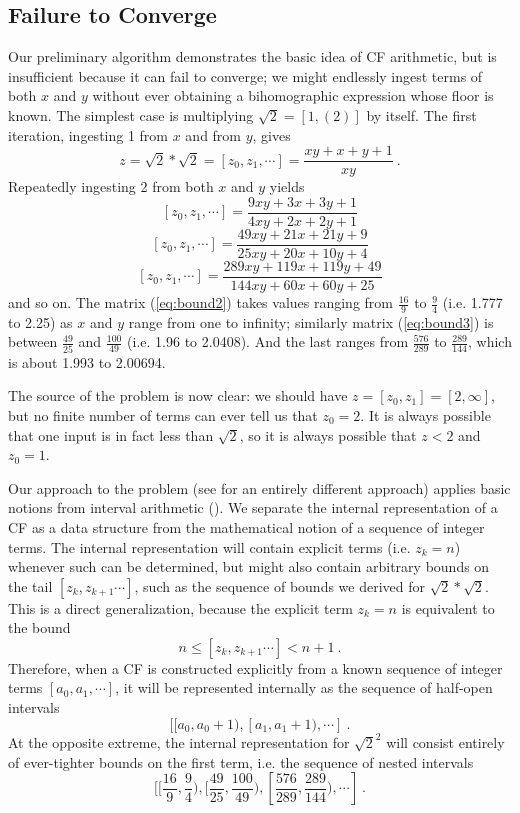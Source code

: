 \documentclass[11pt, oneside]{amsart}   	%
\newcommand{\bihom}[8]{{\frac{#1 xy + #2 x + #3 y + #4}{#5 xy + #6 x + #7 y + #8}}}
\renewcommand{\:}{\negthickspace:\negthickspace}
\begin{document}
\subsection{Failure to Converge}
Our preliminary algorithm demonstrates the basic idea of CF arithmetic, but is insufficient because it can fail to converge;
we might endlessly ingest terms of both $x$ and $y$ without ever obtaining a bihomographic expression whose floor is known. The
simplest case is multiplying $\sqrt{2} = [1,(2)]$ by itself. The first iteration, ingesting 1 from $x$ and from $y$, gives
\begin{equation*}
z = \sqrt{2}*\sqrt{2} = [z_0,z_1, \cdots] = \frac{xy+x+y+1}{xy} \ . %
\end{equation*}
Repeatedly ingesting 2 from both $x$ and $y$ yields
\begin{equation}\label{eq:bound2}
[z_0,z_1, \cdots]  =  \bihom{9}{3}{3}{1}{4}{2}{2}{1}
\end{equation}
\begin{equation}\label{eq:bound3}
[z_0,z_1, \cdots]  =  \bihom{49}{21}{21}{9}{25}{20}{10}{4}
\end{equation}
\begin{equation}\label{eq:bound4}
[z_0,z_1, \cdots]  =  \bihom{289}{119}{119}{49}{144}{60}{60}{25}
\end{equation}
and so on. The matrix (\ref{eq:bound2}) takes values ranging from $\frac{16}{9}$ to $\frac{9}{4}$ (i.e. 1.777 to 2.25)
as $x$ and $y$ range from one to infinity;
similarly matrix (\ref{eq:bound3}) is between $\frac{49}{25}$ and $\frac{100}{49}$ (i.e. 1.96 to 2.0408).
And the last ranges from $\frac{576}{289}$ to $\frac{289}{144}$, which is about 1.993 to 2.00694.

The source of the problem is now clear: we should have $z=[z_0,z_1]=[2,\infty]$, but no finite number of terms can ever tell us that
$z_0=2$. It is always possible that one input is in fact less than $\sqrt{2}$, so it is always possible that $z<2$ and $z_0=1$.

Our approach to the problem (see \cite{Lester01} for an entirely different approach)
applies basic notions from interval arithmetic (\cite{doi:10.1137/1.9780898717716,Mayer+2017}).
We separate the internal representation of a CF as a data structure from the mathematical notion of a  sequence of integer terms. The
internal representation will contain explicit terms (i.e. $z_k=n$) whenever such can be determined, but might also contain arbitrary
bounds on the tail $[z_k, z_{k+1}\cdots]$, such as the  sequence of bounds we derived for $\sqrt{2}*\sqrt{2}$. This is a direct
generalization, because the explicit term  $z_k=n$ is equivalent to the bound 
\[
n \leq [z_k, z_{k+1}\cdots] < n+1 \ .
\]
Therefore, when a CF is constructed explicitly from a known sequence of integer terms $[a_0, a_1, \cdots]$,
it will be represented internally as the sequence of half-open intervals
\[
[[a_0, a_0+1),  [a_1, a_1+1), \cdots]\ .
\] 
At the opposite extreme, the internal representation for $\sqrt{2}^2$ will consist entirely of ever-tighter bounds on the first term, i.e. the sequence of nested intervals
\[
[[\frac{16}{9},\frac{9}{4}), [\frac{49}{25},\frac{100}{49}), [\frac{576}{289},\frac{289}{144}), \cdots]\ .
\] 
\end{document}
